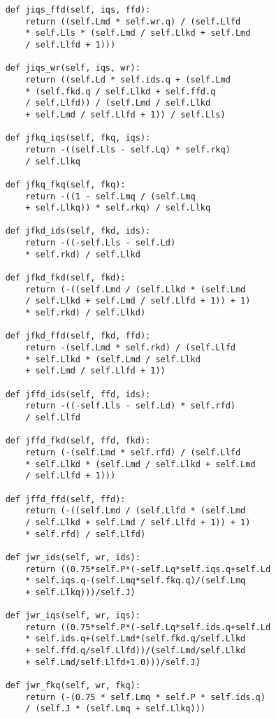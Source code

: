 \begin{lstlisting}
    def jiqs_ffd(self, iqs, ffd):
        return ((self.Lmd * self.wr.q) / (self.Llfd
        * self.Lls * (self.Lmd / self.Llkd + self.Lmd
        / self.Llfd + 1)))
        
    def jiqs_wr(self, iqs, wr):
        return ((self.Ld * self.ids.q + (self.Lmd
        * (self.fkd.q / self.Llkd + self.ffd.q
        / self.Llfd)) / (self.Lmd / self.Llkd
        + self.Lmd / self.Llfd + 1)) / self.Lls)
        
    def jfkq_iqs(self, fkq, iqs):
        return -((self.Lls - self.Lq) * self.rkq)
        / self.Llkq
        
    def jfkq_fkq(self, fkq):
        return -((1 - self.Lmq / (self.Lmq
        + self.Llkq)) * self.rkq) / self.Llkq
        
    def jfkd_ids(self, fkd, ids):
        return -((-self.Lls - self.Ld)
        * self.rkd) / self.Llkd
        
    def jfkd_fkd(self, fkd):
        return (-((self.Lmd / (self.Llkd * (self.Lmd
        / self.Llkd + self.Lmd / self.Llfd + 1)) + 1)
        * self.rkd) / self.Llkd)
        
    def jfkd_ffd(self, fkd, ffd):
        return -(self.Lmd * self.rkd) / (self.Llfd
        * self.Llkd * (self.Lmd / self.Llkd
        + self.Lmd / self.Llfd + 1))
        
    def jffd_ids(self, ffd, ids):
        return -((-self.Lls - self.Ld) * self.rfd)
        / self.Llfd
        
    def jffd_fkd(self, ffd, fkd):
        return (-(self.Lmd * self.rfd) / (self.Llfd
        * self.Llkd * (self.Lmd / self.Llkd + self.Lmd
        / self.Llfd + 1)))
        
    def jffd_ffd(self, ffd):
        return (-((self.Lmd / (self.Llfd * (self.Lmd 
        / self.Llkd + self.Lmd / self.Llfd + 1)) + 1)
        * self.rfd) / self.Llfd)
        
    def jwr_ids(self, wr, ids):
        return ((0.75*self.P*(-self.Lq*self.iqs.q+self.Ld
        * self.iqs.q-(self.Lmq*self.fkq.q)/(self.Lmq
        + self.Llkq)))/self.J)
        
    def jwr_iqs(self, wr, iqs):
        return ((0.75*self.P*(-self.Lq*self.ids.q+self.Ld
        * self.ids.q+(self.Lmd*(self.fkd.q/self.Llkd
        + self.ffd.q/self.Llfd))/(self.Lmd/self.Llkd
        + self.Lmd/self.Llfd+1.0)))/self.J)
        
    def jwr_fkq(self, wr, fkq):
        return (-(0.75 * self.Lmq * self.P * self.ids.q)
        / (self.J * (self.Lmq + self.Llkq)))
        

\end{lstlisting}
